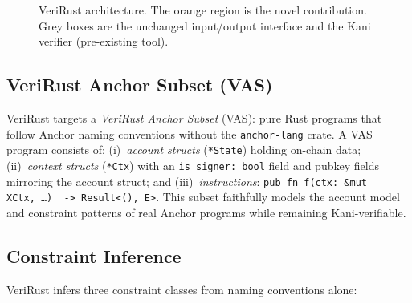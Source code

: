 \documentclass[sigconf,review,anonymous]{acmart}
\begin{document}
\begin{figure}[t]
\caption{VeriRust architecture. The orange region is the novel
  contribution. Grey boxes are the unchanged input/output interface
  and the Kani verifier (pre-existing tool).}
\label{fig:arch}
\end{figure}

\subsection{VeriRust Anchor Subset (VAS)}

VeriRust targets a \emph{VeriRust Anchor Subset} (VAS): pure Rust
programs that follow Anchor naming conventions without the
\texttt{anchor-lang} crate.
A VAS program consists of:
(i)~\emph{account structs} (\texttt{*State}) holding on-chain data;
(ii)~\emph{context structs} (\texttt{*Ctx}) with an
    \texttt{is\_signer:\,bool} field and pubkey fields mirroring the
    account struct; and
(iii)~\emph{instructions}: \texttt{pub fn~f(ctx:\,\&mut XCtx,\,\dots)
    \,\texttt{->}\,Result<(),\,E>}.
This subset faithfully models the account model and constraint
patterns of real Anchor programs while remaining Kani-verifiable.

\subsection{Constraint Inference}
\label{sec:constraints}

VeriRust infers three constraint classes from naming conventions alone:
\end{document}
